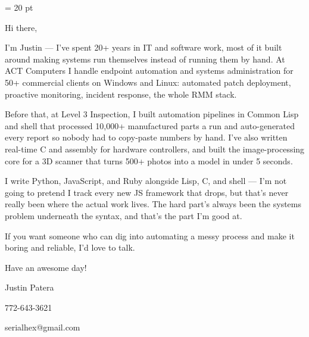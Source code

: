 \parindent = 20 pt

Hi there,

\smallskip

I'm Justin — I've spent 20+ years in IT and software work, most of it built
around making systems run themselves instead of running them by hand. At
ACT Computers I handle endpoint automation and systems administration for
50+ commercial clients on Windows and Linux: automated patch deployment,
proactive monitoring, incident response, the whole RMM stack.

\smallskip

Before that, at Level 3 Inspection, I built automation pipelines in Common
Lisp and shell that processed 10,000+ manufactured parts a run and
auto-generated every report so nobody had to copy-paste numbers by hand.
I've also written real-time C and assembly for hardware controllers, and
built the image-processing core for a 3D scanner that turns 500+ photos into
a model in under 5 seconds.

\smallskip

I write Python, JavaScript, and Ruby alongside Lisp, C, and shell — I'm not
going to pretend I track every new JS framework that drops, but that's never
really been where the actual work lives. The hard part's always been the
systems problem underneath the syntax, and that's the part I'm good at.

\smallskip

If you want someone who can dig into automating a messy process and make it
boring and reliable, I'd love to talk.

\smallskip

Have an awesome day!

\smallskip

Justin Patera

772-643-3621

serialhex@gmail.com
